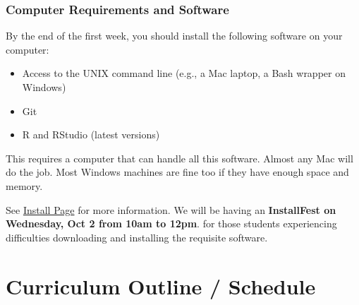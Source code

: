 \documentclass[]{book}
\providecommand{\tightlist}{%
  \setlength{\itemsep}{0pt}\setlength{\parskip}{0pt}}
\begin{document}
\subsubsection*{Computer Requirements and
Software}\label{computer-requirements-and-software}

By the end of the first week, you should install the following software
on your computer:

\begin{itemize}
\tightlist
\item
  Access to the UNIX command line (e.g., a Mac laptop, a Bash wrapper on
  Windows)
\item
  Git
\item
  R and RStudio (latest versions)
\end{itemize}

This requires a computer that can handle all this software. Almost any
Mac will do the job. Most Windows machines are fine too if they have
enough space and memory.

See \href{installation}{Install Page} for more information. We will be
having an \textbf{InstallFest on Wednesday, Oct 2 from 10am to 12pm}.
for those students experiencing difficulties downloading and installing
the requisite software.

\section{Curriculum Outline /
Schedule}\label{curriculum-outline-schedule}
\end{document}
